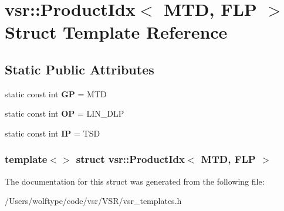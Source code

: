 \hypertarget{structvsr_1_1_product_idx_3_01_m_t_d_00_01_f_l_p_01_4}{\section{vsr\-:\-:Product\-Idx$<$ M\-T\-D, F\-L\-P $>$ Struct Template Reference}
\label{structvsr_1_1_product_idx_3_01_m_t_d_00_01_f_l_p_01_4}
}
\subsection*{Static Public Attributes}
\begin{DoxyCompactItemize}
\item 
\hypertarget{structvsr_1_1_product_idx_3_01_m_t_d_00_01_f_l_p_01_4_a3b4e3af8e7d112373808eefe5f71b50b}{static const int {\bfseries G\-P} = M\-T\-D}\label{structvsr_1_1_product_idx_3_01_m_t_d_00_01_f_l_p_01_4_a3b4e3af8e7d112373808eefe5f71b50b}

\item 
\hypertarget{structvsr_1_1_product_idx_3_01_m_t_d_00_01_f_l_p_01_4_a9415278aaf59740f14ea280f16c5277d}{static const int {\bfseries O\-P} = L\-I\-N\-\_\-\-D\-L\-P}\label{structvsr_1_1_product_idx_3_01_m_t_d_00_01_f_l_p_01_4_a9415278aaf59740f14ea280f16c5277d}

\item 
\hypertarget{structvsr_1_1_product_idx_3_01_m_t_d_00_01_f_l_p_01_4_ac9be345b29252f3e4d628b3050e06e4d}{static const int {\bfseries I\-P} = T\-S\-D}\label{structvsr_1_1_product_idx_3_01_m_t_d_00_01_f_l_p_01_4_ac9be345b29252f3e4d628b3050e06e4d}

\end{DoxyCompactItemize}
\subsubsection*{template$<$$>$ struct vsr\-::\-Product\-Idx$<$ M\-T\-D, F\-L\-P $>$}



The documentation for this struct was generated from the following file\-:\begin{DoxyCompactItemize}
\item 
/\-Users/wolftype/code/vsr/\-V\-S\-R/vsr\-\_\-templates.\-h\end{DoxyCompactItemize}
